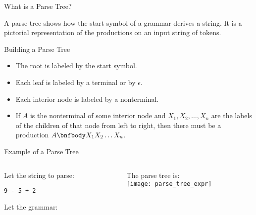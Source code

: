 \begin{bibunit}[apalike]
\begin{frame}{What is a Parse Tree?}
	\begin{small}
	\begin{definition}
	A parse tree shows how the start symbol of a grammar derives a string. It is a pictorial representation of the productions on an input string of tokens.
	\end{definition}
	\begin{block}{\small Building a Parse Tree}
		\begin{itemize}
		\item The root is labeled by the start symbol.
		\item Each leaf is labeled by a terminal or by $\epsilon$.
		\item Each interior node is labeled by a nonterminal.
		\item If $A$ is the nonterminal of some interior node and $X_1, X_2, \dots, X_n$ are the labels of the children of that node from left to right, then there must be a production $A \bnfbody X_1 X_2 \dots X_n$.
		\end{itemize}
	\end{block}
	\end{small}
\end{frame}

\begin{frame}{Example of a Parse Tree}
	\begin{columns}
		\begin{column}[t]{.5\linewidth}
			Let the string to parse:
				\begin{center}\texttt{9 - 5 + 2}\end{center}
			Let the grammar:\\[1em]
			\begin{scriptsize}
			\begin{bnf}
			\end{bnf}
			\end{scriptsize}
		\end{column}
		\begin{column}[t]{.5\linewidth}
			The parse tree is:\\[1em]
			\texttt{[image: parse\_tree\_expr]}
		\end{column}			
	\end{columns}
\end{frame}


\end{bibunit}
